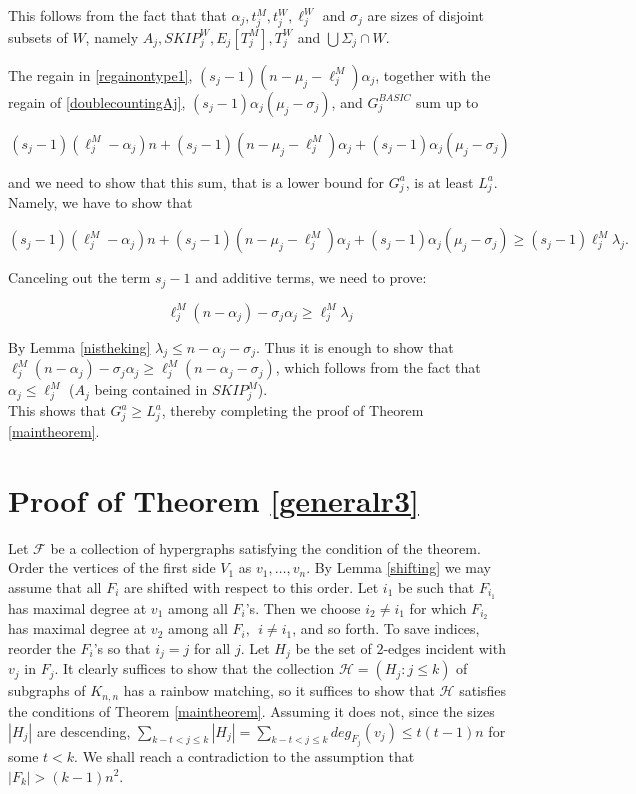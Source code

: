 \documentclass{amsart}
\theoremstyle{remark}
\newcommand{\cf}{\mathcal F}
\newcommand{\ch}{\mathcal H}
\newcommand{\tljm}{{\ell}_{j}^M}
\newcommand{\ljm}{{\ell}_{j}^M}
\newcommand{\tljw}{{\ell}_{j}^W}
\newcommand{\tjm}{t^M_j}
\newcommand{\Tjm}{T^M_j}
\newcommand{\tjw}{t^W_j}
\newcommand{\Tjw}{T^W_j}
\newcommand{\skipmj}{{SKIP}^M_j}
\newcommand{\skipjw}{{SKIP}^W_j}
\begin{document}
This follows from the fact that that $\alpha_j, \tjm, \tjw, \tljw$ and $\sigma_j$ are sizes of  disjoint subsets of $W$, namely $A_j, \skipjw,  E_j[\Tjm], \Tjw$ and $\bigcup \Sigma_j \cap W$.




The regain in \eqref{regainontype1}, $(s_j-1)(n-\mu_j-\tljm)\alpha_j$,
together with the regain of \eqref{doublecountingAj},  $(s_j-1)\alpha_j(\mu_j-\sigma_j)$,
and $G^{BASIC}_j$ sum up to



$$(s_j-1)(\tljm -
\alpha_j)n+(s_j-1)(n-\mu_j-\tljm)\alpha_j+(s_j-1)\alpha_j(\mu_j-\sigma_j)
$$

and we need to show that this sum, that is a lower bound for $G^a_j$,  is at least $L^a_j$. Namely, we have to show that


$$(s_j-1)(\tljm -
\alpha_j)n+(s_j-1)(n-\mu_j-\tljm)\alpha_j+(s_j-1)\alpha_j(\mu_j-\sigma_j) \ge (s_j-1)\ljm \lambda_j.
$$


Canceling out the term $s_j-1$ and additive terms, we need to prove:

$$\ljm(n - \alpha_j)-\sigma_j\alpha_j\ge \ljm\lambda_j$$

By Lemma \ref{nistheking} $\lambda_j \le n -\alpha_j -\sigma_j$.
Thus it is enough to show that $\ljm(n - \alpha_j)-\sigma_j\alpha_j
\ge \ljm(n-\alpha_j-\sigma_j)$, which follows from the fact that
$\alpha_j \le \ljm$ ($A_j$ being contained in $\skipmj$).
\\

This shows that $G^a_j \ge L^a_j$, thereby completing the proof of
Theorem \ref{maintheorem}.











\section{Proof of Theorem \ref{generalr3}}
Let $\cf$ be a collection of hypergraphs satisfying the condition of
the theorem. Order the vertices of the first side $V_1$ as  $v_1,
\ldots ,v_n$. By Lemma \ref{shifting} we may assume that all $F_i$
are shifted with respect to this order. Let $i_1$ be such that
$F_{i_1}$ has maximal degree at $v_1$ among all $F_i$'s. Then we
choose $i_2 \neq i_1$ for which $F_{i_2}$ has maximal degree at
$v_2$ among all $F_i,~~i \neq i_1$, and so forth. To save indices,
reorder the $F_i$'s so that  $i_j=j$ for all $j$. Let $H_j$ be the
set of $2$-edges incident with $v_j$ in $F_j$. It clearly suffices
to show that the collection $\ch=(H_j: j \le k)$ of subgraphs of
$K_{n,n}$ has a rainbow matching, so it suffices  to show that $\ch$
satisfies the conditions of Theorem \ref{maintheorem}. Assuming it
does not, since the sizes $|H_j|$ are descending, $\sum_{k-t <j \le
k} |H_j|= \sum_{k-t <j \le k} deg_{F_j}(v_j)\le t(t-1)n$ for some $t
< k$. We shall reach a contradiction to the assumption that
$|F_k|>(k-1)n^2$.\
\end{document}
